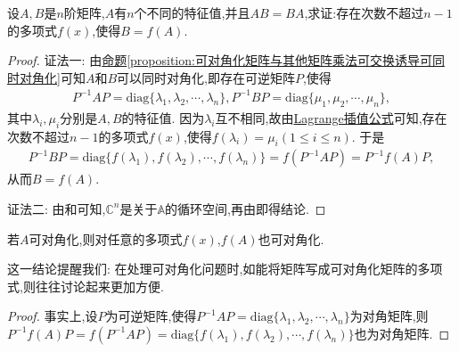 \documentclass[../../main.tex]{subfiles}
\begin{document}
\begin{proposition}\label{proposition:有n个不同特征值的矩阵乘法可交换诱导多项式表示}
设$A,B$是$n$阶矩阵,$A$有$n$个不同的特征值,并且$AB = BA$,求证:存在次数不超过$n - 1$的多项式$f(x)$,使得$B = f(A)$.
\end{proposition}
\begin{proof}
{\color{blue}证法一:}
由\hyperref[proposition:可对角化矩阵与其他矩阵乘法可交换诱导可同时对角化]{命题\ref{proposition:可对角化矩阵与其他矩阵乘法可交换诱导可同时对角化}}可知$A$和$B$可以同时对角化,即存在可逆矩阵$P$,使得
\begin{align*}
P^{-1}AP=\mathrm{diag}\{\lambda_1,\lambda_2,\cdots,\lambda_n\}, P^{-1}BP=\mathrm{diag}\{\mu_1,\mu_2,\cdots,\mu_n\},
\end{align*}
其中$\lambda_i,\mu_i$分别是$A,B$的特征值. 因为$\lambda_i$互不相同,故由\hyperref[theorem:Lagrange插值公式]{Lagrange插值公式}可知,存在次数不超过$n - 1$的多项式$f(x)$,使得$f(\lambda_i)=\mu_i(1\leq i\leq n)$. 于是
\begin{align*}
P^{-1}BP=\mathrm{diag}\{f(\lambda_1),f(\lambda_2),\cdots,f(\lambda_n)\}=f(P^{-1}AP)=P^{-1}f(A)P,
\end{align*}
从而$B = f(A)$.

{\color{blue}证法二:}
由和可知,$\mathbb{C}^n$是关于$\mathbb{A}$的循环空间,再由即得结论.
\end{proof}

\begin{proposition}\label{proposition:矩阵A可对角化则f(A)也可对角化}
若$A$可对角化,则对任意的多项式$f(x)$,$f(A)$也可对角化.
\end{proposition}
\begin{note}
这一结论提醒我们: 在处理可对角化问题时,如能将矩阵写成可对角化矩阵的多项式,则往往讨论起来更加方便.
\end{note}
\begin{proof}
事实上,设$P$为可逆矩阵,使得$P^{-1}AP=\mathrm{diag}\{\lambda_1,\lambda_2,\cdots,\lambda_n\}$为对角矩阵,则$P^{-1}f(A)P=f(P^{-1}AP)=\mathrm{diag}\{f(\lambda_1),f(\lambda_2),\cdots,f(\lambda_n)\}$也为对角矩阵.
\end{proof}
\end{document}
